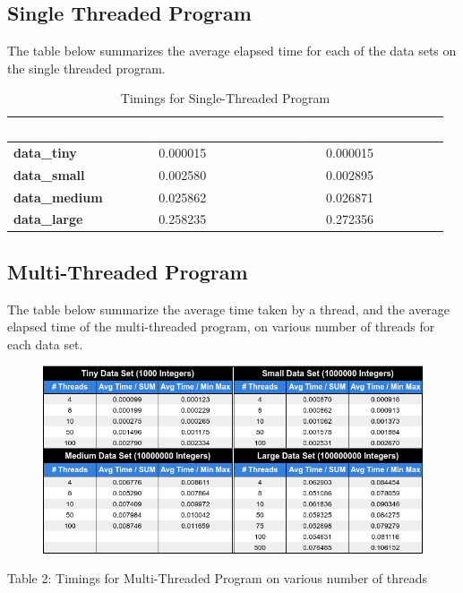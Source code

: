 \documentclass{article}
\theoremstyle{mytheoremstyle}
\theoremstyle{mytheoremstyle}
\theoremstyle{myproblemstyle}
\begin{document}
\subsection{Single Threaded Program}
The table below summarizes the average elapsed time for each of the data sets on the single threaded program.
\begin{table}[h!]
  \centering
  \renewcommand{\arraystretch}{1.5} %
  \setlength\tabcolsep{8pt} %
  \begin{tabular}{|l|c|c|}
    \hline
    \rowcolor{headercolor}
    \textcolor{white}{\textbf{Dataset}} & \textcolor{white}{\textbf{Average Time - SUM}} & \textcolor{white}{\textbf{Average Time - MIN/MAX}} \\ \hline
    \textbf{data\_tiny} & 0.000015 & 0.000015 \\
    \textbf{data\_small} & 0.002580 & 0.002895 \\
    \textbf{data\_medium} & 0.025862 & 0.026871 \\
    \textbf{data\_large} & 0.258235 & 0.272356 \\ \hline
  \end{tabular}
  \caption{Timings for Single-Threaded Program}
  \label{tab:single_threaded_timings}
\end{table}

\vspace*{-5mm}
\subsection{Multi-Threaded Program}
The table below summarize the average time taken by a thread, and the average elapsed time of the multi-threaded program, on various number of threads for each data set.

\begin{figure}[htbp]
  \centering
  \includegraphics[width=1.0\textwidth]{multi.png}
  \label{fig:multitimes}
\end{figure} \vspace*{-5mm}
\begin{center}
  Table 2: Timings for Multi-Threaded Program on various number of threads
\end{center}
\end{document}
